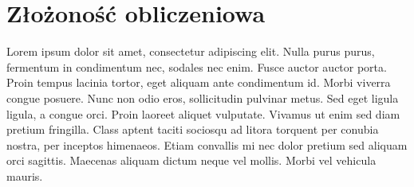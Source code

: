 \section{Złożoność obliczeniowa}
Lorem ipsum dolor sit amet, consectetur adipiscing elit. Nulla purus purus, fermentum in condimentum nec, sodales nec enim. Fusce auctor auctor porta. Proin tempus lacinia tortor, eget aliquam ante condimentum id. Morbi viverra congue posuere. Nunc non odio eros, sollicitudin pulvinar metus. Sed eget ligula ligula, a congue orci. Proin laoreet aliquet vulputate. Vivamus ut enim sed diam pretium fringilla. Class aptent taciti sociosqu ad litora torquent per conubia nostra, per inceptos himenaeos. Etiam convallis mi nec dolor pretium sed aliquam orci sagittis. Maecenas aliquam dictum neque vel mollis. Morbi vel vehicula mauris.
